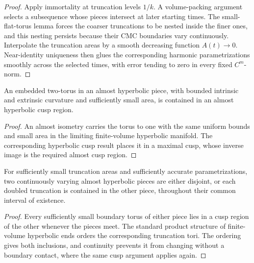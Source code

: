 \begin{proof}
\sketch
Apply immortality at truncation levels \(1/k\).  A volume-packing argument
selects a subsequence whose pieces intersect at later starting times.  The
small-flat-torus lemma forces the coarser truncations to be nested inside the
finer ones, and this nesting persists because their CMC boundaries vary
continuously.  Interpolate the truncation areas by a smooth decreasing function
\(A(t)\to0\).  Near-identity uniqueness then glues the corresponding harmonic
parametrizations smoothly across the selected times, with error tending to zero
in every fixed \(C^m\)-norm.
\end{proof}

\begin{lemma}
\label{lem:chow-iv-small-flat-torus-in-cusp}
An embedded two-torus in an almost hyperbolic piece, with bounded intrinsic and
extrinsic curvature and sufficiently small area, is contained in an almost
hyperbolic cusp region.
\end{lemma}

\begin{proof}
\sketch
An almost isometry carries the torus to one with the same uniform bounds and
small area in the limiting finite-volume hyperbolic manifold.  The
corresponding hyperbolic cusp result places it in a maximal cusp, whose inverse
image is the required almost cusp region.
\end{proof}

\begin{lemma}
\label{lem:chow-iv-almost-hyperbolic-pieces-disjoint}
For sufficiently small truncation areas and sufficiently accurate
parametrizations, two continuously varying almost hyperbolic pieces are either
disjoint, or each doubled truncation is contained in the other piece, throughout
their common interval of existence.
\end{lemma}

\begin{proof}
\sketch
Every sufficiently small boundary torus of either piece lies in a cusp region
of the other whenever the pieces meet.  The standard product structure of
finite-volume hyperbolic ends orders the corresponding truncation tori.  The
ordering gives both inclusions, and continuity prevents it from changing
without a boundary contact, where the same cusp argument applies again.
\end{proof}

